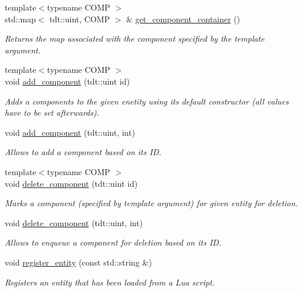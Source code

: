 \begin{DoxyCompactItemize}
{\footnotesize template$<$typename C\+O\+MP $>$ }\\std\+::map$<$ tdt\+::uint, C\+O\+MP $>$ \& \hyperlink{class_entity_system_ab2bacfe1a7fa117764850f60ead892df}{get\+\_\+component\+\_\+container} ()
\begin{DoxyCompactList}\small\item\em Returns the map associated with the component specified by the template argument. \end{DoxyCompactList}\item 
{\footnotesize template$<$typename C\+O\+MP $>$ }\\void \hyperlink{class_entity_system_a556ec8504fcdd38125b0aaa5245aee20}{add\+\_\+component} (tdt\+::uint id)
\begin{DoxyCompactList}\small\item\em Adds a components to the given enetity using it\textquotesingle{}s default constructor (all values have to be set afterwards). \end{DoxyCompactList}\item 
void \hyperlink{class_entity_system_a6e392f209dbdb990cd1d292a32f5eef2}{add\+\_\+component} (tdt\+::uint, int)
\begin{DoxyCompactList}\small\item\em Allows to add a component based on it\textquotesingle{}s ID. \end{DoxyCompactList}\item 
{\footnotesize template$<$typename C\+O\+MP $>$ }\\void \hyperlink{class_entity_system_ad10b62b1ac279603a3cfca317ed9e079}{delete\+\_\+component} (tdt\+::uint id)
\begin{DoxyCompactList}\small\item\em Marks a component (specified by template argument) for given entity for deletion. \end{DoxyCompactList}\item 
void \hyperlink{class_entity_system_ae60c40dddce4f87862e3973b7869b684}{delete\+\_\+component} (tdt\+::uint, int)
\begin{DoxyCompactList}\small\item\em Allows to enqueue a component for deletion based on it\textquotesingle{}s ID. \end{DoxyCompactList}\item 
void \hyperlink{class_entity_system_ab125a824fcafbf43f60250ecd156b421}{register\+\_\+entity} (const std\+::string \&)
\begin{DoxyCompactList}\small\item\em Registers an entity that has been loaded from a Lua script. \end{DoxyCompactList}\item 

\end{DoxyCompactItemize}
